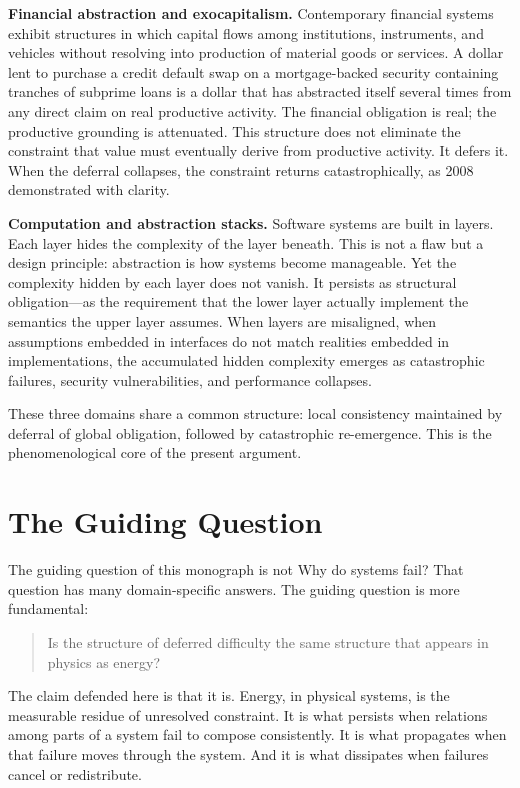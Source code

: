 \documentclass[12pt,a4paper,openany]{book}
\theoremstyle{plain}
\theoremstyle{definition}
\theoremstyle{remark}
\begin{document}
\textbf{Financial abstraction and exocapitalism.} Contemporary financial systems exhibit structures in which capital flows among institutions, instruments, and vehicles without resolving into production of material goods or services. A dollar lent to purchase a credit default swap on a mortgage-backed security containing tranches of subprime loans is a dollar that has abstracted itself several times from any direct claim on real productive activity. The financial obligation is real; the productive grounding is attenuated. This structure does not eliminate the constraint that value must eventually derive from productive activity. It defers it. When the deferral collapses, the constraint returns catastrophically, as 2008 demonstrated with clarity.

\textbf{Computation and abstraction stacks.} Software systems are built in layers. Each layer hides the complexity of the layer beneath. This is not a flaw but a design principle: abstraction is how systems become manageable. Yet the complexity hidden by each layer does not vanish. It persists as structural obligation---as the requirement that the lower layer actually implement the semantics the upper layer assumes. When layers are misaligned, when assumptions embedded in interfaces do not match realities embedded in implementations, the accumulated hidden complexity emerges as catastrophic failures, security vulnerabilities, and performance collapses.

These three domains share a common structure: local consistency maintained by deferral of global obligation, followed by catastrophic re-emergence. This is the phenomenological core of the present argument.

\section{The Guiding Question}

The guiding question of this monograph is not Why do systems fail? That question has many domain-specific answers. The guiding question is more fundamental:

\begin{quote}
Is the structure of deferred difficulty the same structure that appears in physics as energy?
\end{quote}

The claim defended here is that it is. Energy, in physical systems, is the measurable residue of unresolved constraint. It is what persists when relations among parts of a system fail to compose consistently. It is what propagates when that failure moves through the system. And it is what dissipates when failures cancel or redistribute.
\end{document}
